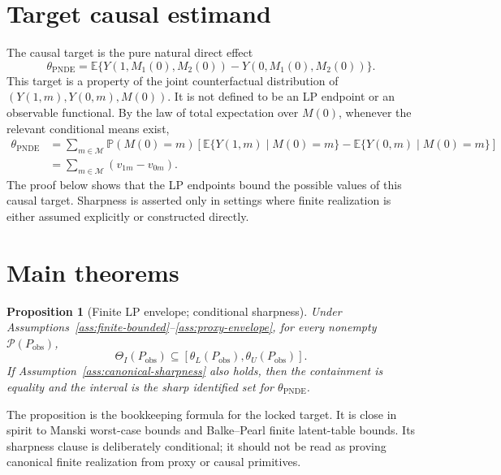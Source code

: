 \documentclass[11pt]{article}
\newcommand{\E}{\mathbb{E}}
\renewcommand{\Pr}{\mathbb{P}}
\theoremstyle{definition}
\theoremstyle{plain}
\newtheorem{proposition}{Proposition}
\theoremstyle{remark}
\begin{document}
\section{Target causal estimand}
The causal target is the pure natural direct effect
\[
  \theta_{\mathrm{PNDE}}
  =
  \E\{Y(1,M_1(0),M_2(0))-Y(0,M_1(0),M_2(0))\}.
\]
This target is a property of the joint counterfactual distribution of
\((Y(1,m),Y(0,m),M(0))\).  It is not defined to be an LP endpoint or an
observable functional.  By the law of total expectation over \(M(0)\),
whenever the relevant conditional means exist,
\[
\begin{aligned}
  \theta_{\mathrm{PNDE}}
  &=
  \sum_{m\in\mathcal M}
    \Pr(M(0)=m)
      \left[
        \E\{Y(1,m)\mid M(0)=m\}
        -\E\{Y(0,m)\mid M(0)=m\}
      \right]\\
  &=
  \sum_{m\in\mathcal M}(v_{1m}-v_{0m}).
\end{aligned}
\]
The proof below shows that the LP endpoints bound the possible values of this
causal target.  Sharpness is asserted only in settings where finite
realization is either assumed explicitly or constructed directly.

\section{Main theorems}
\begin{proposition}[Finite LP envelope; conditional sharpness]\label{prop:lp-envelope}
Under Assumptions~\ref{ass:finite-bounded}--\ref{ass:proxy-envelope}, for every
nonempty \(\mathcal P(P_{\mathrm{obs}})\),
\[
  \Theta_I(P_{\mathrm{obs}})
  \subseteq
  [\theta_L(P_{\mathrm{obs}}),\theta_U(P_{\mathrm{obs}})].
\]
If Assumption~\ref{ass:canonical-sharpness} also holds, then the containment is
equality and the interval is the sharp identified set for
\(\theta_{\mathrm{PNDE}}\).
\end{proposition}

The proposition is the bookkeeping formula for the locked target.  It is close
in spirit to Manski worst-case bounds and Balke--Pearl finite latent-table
bounds.  Its sharpness clause is deliberately conditional; it should not be
read as proving canonical finite realization from proxy or causal primitives.
\end{document}
